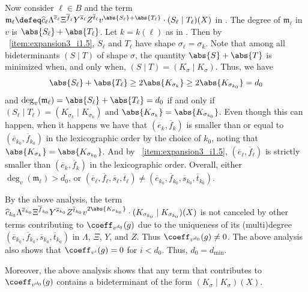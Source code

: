 \documentclass[letterpaper, 11pt]{amsart}
\begin{document}
\begin{pf}
Now consider $\ell\in B$ and the term $\mathfrak{m}_\ell\defeq\widehat{c}_{\ell} \Lambda^{\overline{e}_\ell}\Xi^{\overline{f}_\ell}Y^{\overline{s}_\ell}Z^{\overline{t}_\ell}v^{\abs{S_\ell} + \abs{T_\ell}}\cdot (S_\ell\mid T_\ell)(X)$ in .
The degree of $\mathfrak{m}_\ell$ in $v$ is $\abs{S_\ell} + \abs{T_\ell}$.
Let $k=k(\ell)$ as in .
Then by ~\eqref{item:expansion3_i1.5}, $S_\ell$ and $T_\ell$ have shape $\sigma_\ell=\sigma_k$.
Note that among all bideterminants $(S\mid T)$ of shape $\sigma$, the quantity $\abs{S} + \abs{T}$ is minimized when, and only when, $(S\mid T)=(K_\sigma\mid K_\sigma)$.
Thus, we have 
\[
    \abs{S_\ell} + \abs{T_\ell} \geq 2 \abs{K_{\sigma_k}} \geq  2\abs{K_{\sigma_{k_0}}}=d_0
\]
and $\deg_v(\mathfrak{m}_\ell) = \abs{S_\ell} + \abs{T_\ell} = d_0$ if and only if $(S_\ell\mid T_\ell)=(K_{\sigma_k}\mid K_{\sigma_k})$ and $\abs{K_{\sigma_{k}}} = \abs{K_{\sigma_{k_0}}}$.
Even though this can happen, when it happens we have that $(\overline{e}_k,\overline{f}_k)$ is smaller than or equal to $(\overline{e}_{k_0},\overline{f}_{k_0})$ in the lexicographic order by the choice of $k_0$, noting that $\abs{K_{\sigma_{k}}} = \abs{K_{\sigma_{k_0}}}$.
And by ~\eqref{item:expansion3_i1.5}, $(\overline{e}_\ell, \overline{f}_\ell)$ is strictly smaller than $(\overline{e}_k,\overline{f}_k)$ in the lexicographic order.
Overall, either $\deg_v(\mathfrak{m}_\ell)>d_0$, or $(\overline{e}_\ell,\overline{f}_\ell,\overline{s}_\ell,\overline{t}_\ell)\neq (\overline{e}_{k_0},\overline{f}_{k_0},\overline{s}_{k_0},\overline{t}_{k_0})$.

By the above analysis, the term $\widehat{c}_{k_0} \Lambda^{\overline{e}_{k_0}}\Xi^{\overline{f}_{k_0}}Y^{\overline{s}_{k_0}}Z^{\overline{t}_{k_0}}v^{2 \abs{K_{\sigma_{k_0}}}}\cdot (K_{\sigma_{k_0}}\mid K_{\sigma_{k_0}})(X)$ is not canceled by other terms contributing to $\coeff_{v^{d_0}}(g)$ due to the uniqueness of its (multi)degree $(\overline{e}_{k_0},\overline{f}_{k_0},\overline{s}_{k_0},\overline{t}_{k_0})$ in $\Lambda$, $\Xi$, $Y$, and $Z$.
Thus $\coeff_{v^{d_0}}(g)\neq 0$.
The above analysis also shows that $\coeff_{v^{i}}(g)=0$ for $i<d_0$.
Thus, $d_0=d_{\min}$.

Moreover, the above analysis shows that any term that contributes to $\coeff_{v^{d_0}}(g)$ contains a bideterminant of the form $(K_\sigma \mid K_\sigma)(X)$.


\end{pf}
\end{document}
